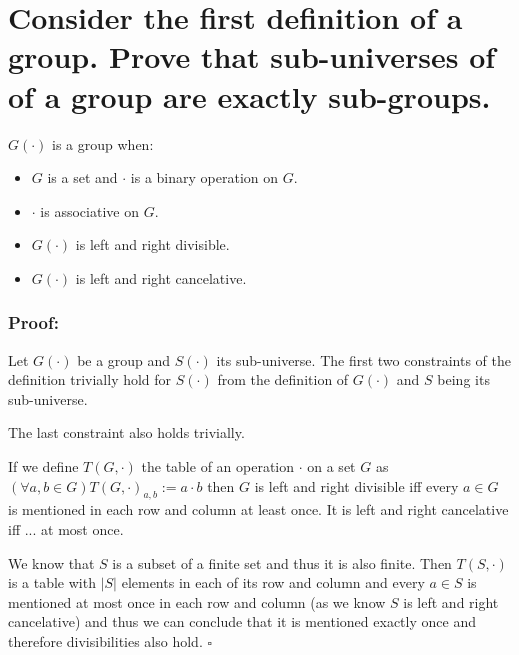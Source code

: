 \documentclass[11pt]{article}
\begin{document}
    \part*{Consider the first definition of a group. Prove that sub-universes of of a group are exactly sub-groups.}
    
    $G(\cdot)$ is a group when:
    \begin{itemize}
        \item $G$ is a set and $\cdot$ is a binary operation on $G$.
        \item $\cdot$ is associative on $G$.
        \item $G(\cdot)$ is left and right divisible.
        \item $G(\cdot)$ is left and right cancelative.
    \end{itemize}

    \section*{Proof:}

    Let $G(\cdot)$ be a group and $S(\cdot)$ its sub-universe. The first two constraints of the definition trivially hold for $S(\cdot)$ from the definition of $G(\cdot)$ and $S$ being its sub-universe.

    The last constraint also holds trivially.

    If we define $T(G, \cdot)$ the table of an operation $\cdot$ on a set $G$ as $(\forall a, b \in G) T(G, \cdot)_{a, b} := a \cdot b$ then $G$ is left and right divisible iff every $a \in G$ is mentioned in each row and column at least once. It is left and right cancelative iff ... at most once.

    We know that $S$ is a subset of a finite set and thus it is also finite. Then $T(S, \cdot)$ is a table with $|S|$ elements in each of its row and column and every $a \in S$ is mentioned at most once in each row and column (as we know $S$ is left and right cancelative) and thus we can conclude that it is mentioned exactly once and therefore divisibilities also hold. $\square$
\end{document}

